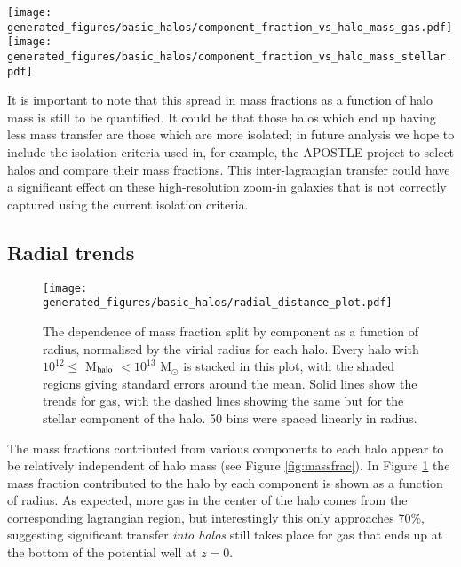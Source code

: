\begin{figure*} \centering
	\texttt{[image: generated\_figures/basic\_halos/component\_fraction\_vs\_halo\_mass\_gas.pdf]}
	\texttt{[image: generated\_figures/basic\_halos/component\_fraction\_vs\_halo\_mass\_stellar.pdf]}
	\caption{Left: fraction of gaseous mass at $z=0$ in each halo from each
	component; right: fraction of stellar mass at $z=0$ from each
	component. Note that there is significantly more transfer shown in the
	gaseous component. Gas that is transferred between lagrangian regions
	must be given time to cool before being able to form stars. As the
	events that enable transfer are typically very energetic (AGN, stellar
	feedback, accretion), it is unlikely that the cooling time will be
	short enough to form stars by the end of the simulation for most
	transfer.} \label{fig:splitmassfrac} \end{figure*}

It is important to note that this spread in mass fractions as a function of
halo mass is still to be quantified. It could be that those halos which
end up having less mass transfer are those which are more isolated; in future
analysis we hope to include the isolation criteria used in, for example, the
APOSTLE project \citep{fattahi2016} to select halos and compare their mass
fractions. This inter-lagrangian transfer could have a significant effect
on these high-resolution zoom-in galaxies that is not correctly captured
using the current isolation criteria.

\subsection{Radial trends}

\begin{figure} \centering
	\texttt{[image: generated\_figures/basic\_halos/radial\_distance\_plot.pdf]}
	\caption{The dependence of mass fraction split by component as a
	function of radius, normalised by the virial radius for each halo.
	Every halo with $10^{12} \leq $ M$_{\rm halo}$ $ < 10^{13}$ M$_\odot$
	is stacked in this plot, with the shaded regions giving standard errors
	around the mean. Solid lines show the trends for gas, with the dashed
	lines showing the same but for the stellar component of the halo. 50
	bins were spaced linearly in radius.} \label{fig:radialmassfrac}
\end{figure}

The mass fractions contributed from various components to each halo appear to
be relatively independent of halo mass (see Figure \ref{fig:massfrac}). In
Figure \ref{fig:radialmassfrac} the mass fraction contributed to the halo by
each component is shown as a function of radius. As expected, more gas in the
center of the halo comes from the corresponding lagrangian region, but
interestingly this only approaches 70\%, suggesting significant transfer
\emph{into halos} still takes place for gas that ends up at the bottom of the
potential well at $z=0$.

